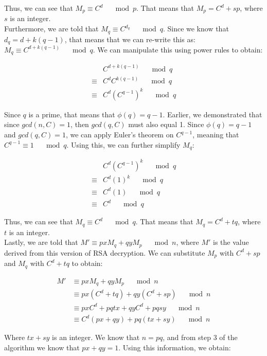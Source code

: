 \documentclass[11pt]{article}
\theoremstyle{definition}
\begin{document}
\begin{enumerate}
Thus, we can see that $M_p \equiv C^d \quad \mod{p}$. That means that $M_p = C^d + sp$, where $s$ is an integer. \\

Furthermore, we are told that $M_q \equiv C^{d_q} \quad \mod{q}$. Since we know that $d_q = d + k(q-1)$, that means that we can re-write this as: $M_q \equiv C^{d + k(q-1)} \quad \mod{q}$. We can manipulate this using power rules to obtain:

\begin{align*}
    &C^{d + k(q-1)} \quad \mod{q} \\
    \equiv &C^d C^{k(q-1)} \quad \mod{q} \\
    \equiv &C^d (C^{q-1})^k \quad \mod{q}
\end{align*}

Since $q$ is a prime, that means that $\phi{(q)} = q - 1$. Earlier, we demonstrated that since $gcd(n, C) = 1$, then $gcd(q, C)$ must also equal 1. Since $\phi{(q)} = q - 1$ and $gcd(q, C) = 1$, we can apply Euler's theorem on $C^{q - 1}$, meaning that $C^{q - 1} \equiv 1 \quad \mod{q}$. Using this, we can further simplify $M_q$:

\begin{align*}
    &C^d (C^{q-1})^k \quad \mod{q} \\
    \equiv &C^d (1)^k \quad \mod{q} \\
    \equiv &C^d (1) \quad \mod{q} \\
    \equiv &C^d \quad \mod{q}
\end{align*}


Thus, we can see that $M_q \equiv C^d \quad \mod{q}$. That means that $M_q = C^d + tq$, where $t$ is an integer. \\

Lastly, we are told that $M' \equiv pxM_q + qyM_p \quad \mod{n}$, where $M'$ is the value derived from this version of RSA decryption. We can substitute $M_p$ with $C^d + sp$ and $M_q$ with $C^d + tq$ to obtain:

\begin{align*}
    M' &\equiv pxM_q + qyM_p \quad \mod{n} \\
    &\equiv px(C^d + tq) + qy(C^d + sp) \quad \mod{n} \\
    &\equiv pxC^d + pqtx + qyC^d + pqsy \quad \mod{n} \\
    &\equiv C^d(px + qy) + pq(tx + sy) \quad \mod{n}
\end{align*}

Where $tx + sy$ is an integer. We know that $n = pq$, and from step 3 of the algorithm we know that $px + qy = 1$. Using this information, we obtain:


\end{enumerate}
\end{document}
